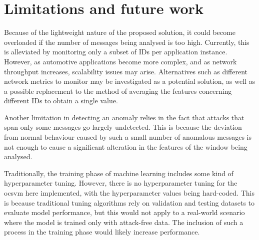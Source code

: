 \chapter{Limitations and future work}
\label{c:limitations}

Because of the lightweight nature of the proposed solution, it could become overloaded if the number of messages being analysed is too high. Currently, this is alleviated by monitoring only a subset of IDs per application instance. However, as automotive applications become more complex, and as network throughput increases, scalability issues may arise. Alternatives such as different network metrics to monitor may be investigated as a potential solution, as well as a possible replacement to the method of averaging the features concerning different IDs to obtain a single value.\par

Another limitation in detecting an anomaly relies in the fact that attacks that span only some messages go largely undetected. This is because the deviation from normal behaviour caused by such a small number of anomalous messages is not enough to cause a significant alteration in the features of the window being analysed.\par

Traditionally, the training phase of machine learning includes some kind of hyperparameter tuning. However, there is no hyperparameter tuning for the \gls{ocsvm} here implemented, with the hyperparameter values being hard-coded. This is because traditional tuning algorithms rely on validation and testing datasets to evaluate model performance, but this would not apply to a real-world scenario where the model is trained only with attack-free data. The inclusion of such a process in the training phase would likely increase performance.